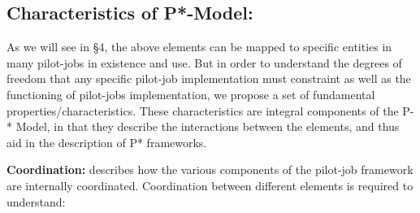 \documentclass[conference,final]{IEEEtran}
\begin{document}
 

% 
% 


\subsection{Characteristics of P*-Model:}
\label{sec:p_star_elements}

As we will see in \S4, the above elements can be mapped to specific
entities in many pilot-jobs in existence and use.  But in order to
understand the degrees of freedom that any specific pilot-job
implementation must constraint as well as the functioning of
pilot-jobs implementation, we propose a set of fundamental
properties/characteristics. These characteristics are integral
components of the P-* Model, in that they describe the interactions
between the elements, and thus aid in the description of P*
frameworks. 


\textbf{Coordination:} describes how the various components of the
pilot-job framework are internally coordinated. Coordination between
different elements is required to understand:
\end{document}
